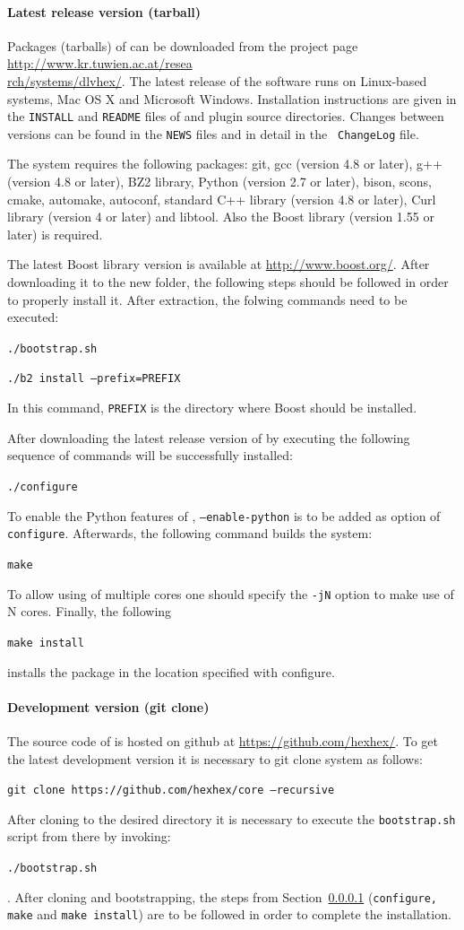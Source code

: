 \documentclass[a4paper, titlepage]{article}
\begin{document}
\paragraph{Latest release version (tarball)}
\label{sec:steps}
Packages (tarballs) of \dlvhex{} can be downloaded from the 
project page \url{http://www.kr.tuwien.ac.at/resea} \\ 
\url{rch/systems/dlvhex/}. The latest release of the 
software runs on Linux-based systems, Mac OS X and 
Microsoft Windows. Installation instructions are given in 
the {\tt INSTALL} and {\tt README} files of \dlvhex{} 
and plugin source directories. Changes between versions can 
be found in the {\tt NEWS} files and in detail in the {\tt 
ChangeLog} file. 

The system requires the following packages: git, gcc 
(version 4.8 or later), g++ (version 4.8 or later), BZ2 
library, Python (version 2.7 or later), bison, scons, 
cmake, automake, autoconf, standard C++ library (version 
4.8 or later), Curl library (version 4 or later) and 
libtool. Also the Boost library (version 1.55 or later) is 
required. 

The latest Boost library version is available at 
\url{http://www.boost.org/}. After downloading it to the 
new folder, the following steps should be followed in order 
to properly install it. After extraction, the folwing 
commands need to be executed:
\\ \centerline{\texttt{./bootstrap.sh}}
\centerline{\texttt{./b2 install --prefix=PREFIX}} In this 
command, \texttt{PREFIX} is the directory where Boost should 
be installed. 

After downloading the latest release version of \dlvhex{} by 
executing the following sequence of commands \dlvhex{} will 
be successfully installed:
\\ \centerline{\texttt{./configure}} To enable the Python 
features of \dlvhex{}, \texttt{--enable-python} is to be 
added as option of \texttt{configure}. Afterwards, the 
following command builds the system:
\\ \centerline{\texttt{make}} To allow using of multiple 
cores one should specify the \texttt{-jN} option to make 
use of N cores. Finally, the following
\\ \centerline{\texttt{make install}} installs the package 
in the location specified with configure.  
   
\paragraph{Development version (git clone)}
The source code of \dlvhex{} is hosted on github at 
\url{https://github.com/hexhex/}. To get the latest 
development version it is necessary to git clone system as 
follows:
\\ \centerline{\texttt{git clone 
https://github.com/hexhex/core --recursive}} 
After cloning to the desired directory it is necessary to 
execute the \texttt{bootstrap.sh} script from there by invoking: \\ 
\centerline{\texttt{./bootstrap.sh}}. 
After cloning and bootstrapping, the steps from 
Section~\ref{sec:steps} (\texttt{configure, make} and 
\texttt{make install}) are to be followed in order to 
complete the installation.
\end{document}
